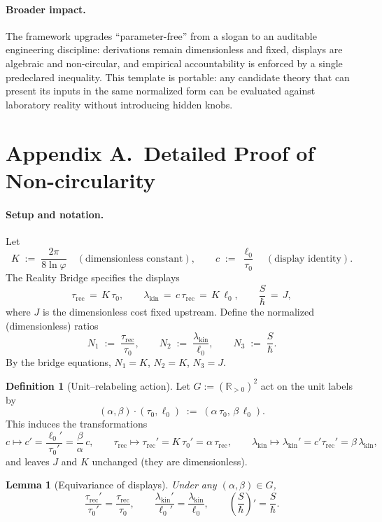 \documentclass[11pt]{article}
\theoremstyle{plain}
\newtheorem{lemma}{Lemma}
\theoremstyle{definition}
\newtheorem{definition}{Definition}
\theoremstyle{remark}
\begin{document}
\paragraph{Broader impact.}
The framework upgrades “parameter-free” from a slogan to an auditable engineering discipline: derivations remain dimensionless and fixed, displays are algebraic and non-circular, and empirical accountability is enforced by a single pre\-declared inequality. This template is portable: any candidate theory that can present its inputs in the same normalized form can be evaluated against laboratory reality without introducing hidden knobs.

\appendix

\section*{Appendix A.\ Detailed Proof of Non-circularity}

\paragraph{Setup and notation.}
Let
\[
K\;:=\;\frac{2\pi}{8\ln\varphi}\quad(\text{dimensionless constant}),\qquad
c\;:=\;\frac{\ell_{0}}{\tau_{0}}\quad(\text{display identity}).
\]
The Reality Bridge specifies the displays
\[
\tau_{\mathrm{rec}}\,=\,K\,\tau_{0},\qquad
\lambda_{\mathrm{kin}}\,=\,c\,\tau_{\mathrm{rec}}\,=\,K\,\ell_{0},\qquad
\frac{S}{\hbar}\,=\,J,
\]
where \(J\) is the dimensionless cost fixed upstream. Define the normalized (dimensionless) ratios
\[
N_{1}\;:=\;\frac{\tau_{\mathrm{rec}}}{\tau_{0}},\qquad
N_{2}\;:=\;\frac{\lambda_{\mathrm{kin}}}{\ell_{0}},\qquad
N_{3}\;:=\;\frac{S}{\hbar}.
\]
By the bridge equations, \(N_{1}=K\), \(N_{2}=K\), \(N_{3}=J\).

\begin{definition}[Unit–relabeling action]
Let \(G:=(\mathbb{R}_{>0})^{2}\) act on the unit labels by
\[
(\alpha,\beta)\cdot(\tau_{0},\ell_{0})\;:=\;(\alpha\,\tau_{0},\,\beta\,\ell_{0}).
\]
This induces the transformations
\[
c\mapsto c'=\frac{\ell_{0}'}{\tau_{0}'}=\frac{\beta}{\alpha}\,c,\qquad
\tau_{\mathrm{rec}}\mapsto\tau_{\mathrm{rec}}'=K\,\tau_{0}'=\alpha\,\tau_{\mathrm{rec}},\qquad
\lambda_{\mathrm{kin}}\mapsto\lambda_{\mathrm{kin}}'=c'\tau_{\mathrm{rec}}'=\beta\,\lambda_{\mathrm{kin}},
\]
and leaves \(J\) and \(K\) unchanged (they are dimensionless).
\end{definition}

\begin{lemma}[Equivariance of displays]\label{lem:equivariance}
Under any \((\alpha,\beta)\in G\),
\[
\frac{\tau_{\mathrm{rec}}'}{\tau_{0}'}=\frac{\tau_{\mathrm{rec}}}{\tau_{0}},\qquad
\frac{\lambda_{\mathrm{kin}}'}{\ell_{0}'}=\frac{\lambda_{\mathrm{kin}}}{\ell_{0}},\qquad
\left(\frac{S}{\hbar}\right)'\!=\frac{S}{\hbar}.
\]
\end{lemma}
\end{document}
